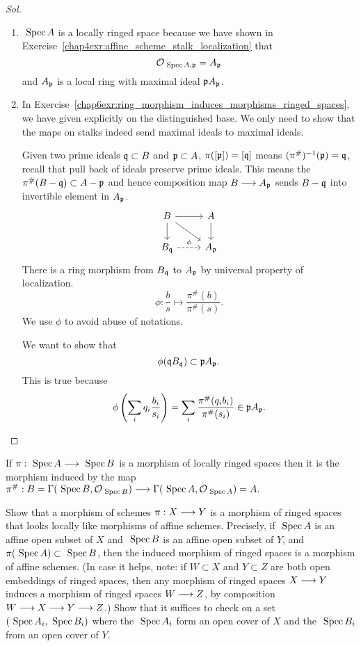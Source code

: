 \documentclass[11pt]{book} %
\begin{document}
\begin{proof}[Sol]
\begin{enumerate}[label=(\alph*)]
\item $\text{ Spec\,} A$ is a locally ringed space because we have shown in Exercise~\ref{chap4exr:affine_scheme_stalk_localization} that
$$
{\cal O}_{\text{ Spec\,} A,{\mathfrak p}}=A_{\mathfrak p}
$$
and $A_{\mathfrak p}$ is a local ring with maximal ideal ${\mathfrak p} A_{\mathfrak p}$.
\item In Exercise~\ref{chap6exr:ring_morphism_induces_morphisms_ringed_spaces}, we have given explicitly on the distinguished base. We only need to show that the maps on stalks indeed send maximal ideals to maximal ideals.

Given two prime ideals $\mathfrak q\subset B$ and ${\mathfrak p}\subset A$, $\pi([{\mathfrak p}])=[\mathfrak q]$ means $(\pi^{\#})^{-1}({\mathfrak p})=\mathfrak q$, recall that pull back of ideals preserve prime ideals. This means the $\pi^\#(B-\mathfrak q)\subset A-{\mathfrak p}$ and hence composition map $B\longrightarrow A_{\mathfrak p}$ sends $B-\mathfrak q$ into invertible element in $A_{\mathfrak p}$.  
$$
\begin{tikzcd}
B \arrow[d] \arrow[r] \arrow[rd] & A \arrow[d] \\
B_\scq \arrow[r, "\phi", dashed] & A_\scp
\end{tikzcd}
$$
There is a ring morphism from $B_\mathfrak q$ to $A_{\mathfrak p}$ by universal property of localization. 
$$
\phi:
\frac{b}{s}\mapsto \frac{\pi^\#(b)}{\pi^\#(s)}.
$$
We use $\phi$ to avoid abuse of notations.

We want to show that
$$
\phi(\mathfrak q B_\mathfrak q)\subset {\mathfrak p} A_{\mathfrak p}.
$$
This is true because 
$$
\phi\left(\sum_i q_i \frac{b_i}{s_i}\right)=\sum_i \frac{\pi^\#(q_i b_i)}{\pi^\#(s_i)}\in {\mathfrak p} A_{\mathfrak p}.
$$ 
\end{enumerate}
\end{proof}
\begin{proposition}
If $\pi:\text{ Spec\,} A\longrightarrow \text{ Spec\,} B$ is a morphism of locally ringed spaces then it is the morphism induced by the map $\pi^\#:B=\Gamma(\text{ Spec\,} B,{\cal O}_{\text{ Spec\,} B})\longrightarrow \Gamma(\text{ Spec\,} A,{\cal O}_{\text{ Spec\,} A})=A.$
\end{proposition}
\begin{exr}\label{chap6exr:equivalent_defs_morphisms_of_schemes}
Show that  a morphism of schemes $\pi:X\longrightarrow Y$ is a morphism of ringed spaces that looks locally like morphisms of affine schemes. Precisely, if $\text{ Spec\,} A$ is an affine open subset of $X$ and $\text{ Spec\,} B$ is an affine open subset of $Y$, and $\pi(\text{ Spec\,} A)\subset \text{ Spec\,} B$, then the induced morphism of ringed spaces is a morphism of affine schemes. (In case it helps, note: if $W\subset X$ and $Y\subset Z$ are both open embeddings of ringed spaces, then any morphism of ringed spaces $X\longrightarrow Y$ induces a morphism of ringed spaces $W\longrightarrow Z$, by composition $W\longrightarrow X\longrightarrow Y\longrightarrow Z$.) Show that it suffices to check on a set $(\text{ Spec\,} A_i,\text{ Spec\,} B_i)$ where the $\text{ Spec\,} A_i$ form an open cover of $X$ and the $\text{ Spec\,} B_i$ from an open cover of $Y$.
\end{exr}
\end{document}
